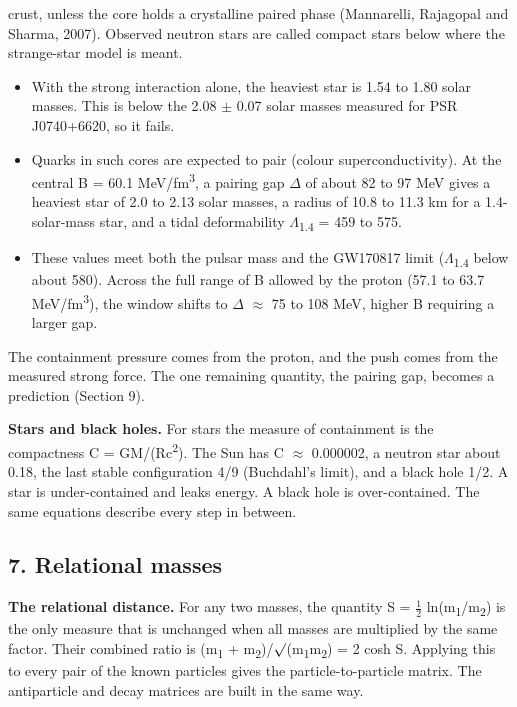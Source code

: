 \documentclass[
  11pt,
]{article}
\providecommand{\tightlist}{%
  \setlength{\itemsep}{0pt}\setlength{\parskip}{0pt}}
\begin{document}
crust, unless the core holds a crystalline paired phase (Mannarelli, Rajagopal and Sharma, 2007). Observed neutron stars are called compact stars below where the strange-star model is meant.

\begin{itemize}
\tightlist
\item
  With the strong interaction alone, the heaviest star is 1.54 to 1.80 solar masses. This is below the 2.08 \ensuremath{\pm} 0.07 solar masses measured for PSR J0740+6620, so it fails.
\item
  Quarks in such cores are expected to pair (colour superconductivity). At the central B = 60.1 MeV/fm\textsuperscript{3}, a pairing gap \ensuremath{\Delta} of about 82 to 97 MeV gives a heaviest star of 2.0 to 2.13 solar masses, a radius of 10.8 to 11.3 km for a 1.4-solar-mass star, and a tidal deformability \ensuremath{\Lambda}\textsubscript{1.4} = 459 to 575.
\item
  These values meet both the pulsar mass and the GW170817 limit (\ensuremath{\Lambda}\textsubscript{1.4} below about 580). Across the full range of B allowed by the proton (57.1 to 63.7 MeV/fm\textsuperscript{3}), the window shifts to \ensuremath{\Delta} \ensuremath{\approx} 75 to 108 MeV, higher B requiring a larger gap.
\end{itemize}

The containment pressure comes from the proton, and the push comes from the measured strong force. The one remaining quantity, the pairing gap, becomes a prediction (Section 9).

\textbf{Stars and black holes.} For stars the measure of containment is the compactness C = GM/(Rc\textsuperscript{2}). The Sun has C \ensuremath{\approx} 0.000002, a neutron star about 0.18, the last stable configuration 4/9 (Buchdahl's limit), and a black hole 1/2. A star is under-contained and leaks energy. A black hole is over-contained. The same equations describe every step in between.

\hypertarget{relational-masses}{%
\subsection{7. Relational masses}\label{relational-masses}}

\textbf{The relational distance.} For any two masses, the quantity S = \ensuremath{\frac{1}{2}} ln(m\textsubscript{1}/m\textsubscript{2}) is the only measure that is unchanged when all masses are multiplied by the same factor. Their combined ratio is (m\textsubscript{1} + m\textsubscript{2})/\ensuremath{\surd}(m\textsubscript{1}m\textsubscript{2}) = 2 cosh S. Applying this to every pair of the known particles gives the particle-to-particle matrix. The antiparticle and decay matrices are built in the same way.
\end{document}
